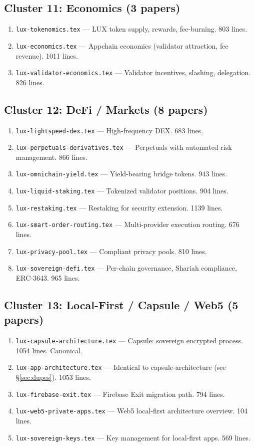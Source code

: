 \documentclass[11pt,a4paper]{article}
\begin{document}
\subsection{Cluster 11: Economics (3 papers)}
\begin{enumerate}[leftmargin=2em]
\item \texttt{lux-tokenomics.tex} --- LUX token supply, rewards, fee-burning. 803 lines.
\item \texttt{lux-economics.tex} --- Appchain economics (validator attraction, fee revenue). 1011 lines.
\item \texttt{lux-validator-economics.tex} --- Validator incentives, slashing, delegation. 826 lines.
\end{enumerate}

\subsection{Cluster 12: DeFi / Markets (8 papers)}
\begin{enumerate}[leftmargin=2em]
\item \texttt{lux-lightspeed-dex.tex} --- High-frequency DEX. 683 lines.
\item \texttt{lux-perpetuals-derivatives.tex} --- Perpetuals with automated risk management. 866 lines.
\item \texttt{lux-omnichain-yield.tex} --- Yield-bearing bridge tokens. 943 lines.
\item \texttt{lux-liquid-staking.tex} --- Tokenized validator positions. 904 lines.
\item \texttt{lux-restaking.tex} --- Restaking for security extension. 1139 lines.
\item \texttt{lux-smart-order-routing.tex} --- Multi-provider execution routing. 676 lines.
\item \texttt{lux-privacy-pool.tex} --- Compliant privacy pools. 810 lines.
\item \texttt{lux-sovereign-defi.tex} --- Per-chain governance, Shariah compliance, ERC-3643. 965 lines.
\end{enumerate}

\subsection{Cluster 13: Local-First / Capsule / Web5 (5 papers)}
\begin{enumerate}[leftmargin=2em]
\item \texttt{lux-capsule-architecture.tex} --- Capsule: sovereign encrypted process. 1054 lines. Canonical.
\item \texttt{lux-app-architecture.tex} --- Identical to capsule-architecture (see \S\ref{sec:dupes}). 1053 lines.
\item \texttt{lux-firebase-exit.tex} --- Firebase Exit migration path. 794 lines.
\item \texttt{lux-web5-private-apps.tex} --- Web5 local-first architecture overview. 104 lines.
\item \texttt{lux-sovereign-keys.tex} --- Key management for local-first apps. 569 lines.
\end{enumerate}
\end{document}
